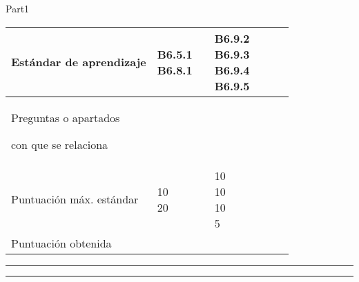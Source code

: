 \documentclass[9pt]{scrartcl}
\begin{document}
\begin{exam}{Part1}
\begin{onehalfspace}
\begin{table}[h]
\begin{center}
\begin{tabular}{|p{3.2cm}|p{1.3cm}|p{1.3cm}|p{1.3cm}|p{1.3cm}|p{1.3cm}|p{1.3cm}|}
\hline
{\scriptsize Estándar de aprendizaje}
& \centering {\scriptsize B6.5.1 \\ B6.8.1\\ }
& \centering {\scriptsize Ninguno }
& \centering {\scriptsize B6.9.2 \\ B6.9.3 \\ B6.9.4 \\ B6.9.5\\ }
\tabularnewline \hline {\scriptsize Preguntas o apartados \par con que se relaciona}
 &  \centering {\scriptsize 1 }
 &  \centering {\scriptsize 2 }
 &  \centering {\scriptsize 3 }
 \tabularnewline \hline
 {\scriptsize Puntuación máx. estándar}
  &  \centering {\scriptsize 10\\20\\ } 
  &  \centering {\scriptsize  } 
  &  \centering {\scriptsize 10\\10\\10\\5\\ } 
\tabularnewline \hline
 {\scriptsize Puntuación obtenida } 
 &  \vspace*{1cm} \centering \vspace*{1.5cm} 
 &  \centering 
 &  \tabularnewline 
\hline 
\end{tabular}
\end{center}
\end{table}
\hrule

\hrule
\end{onehalfspace}
\end{exam} 
\end{document}
